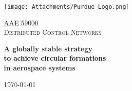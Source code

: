 %
%
%

\begin{titlepage}

\center %


\texttt{[image: Attachments/Purdue\_Logo.png]}\\
\vspace{1in}
 


\textsc{\LARGE AAE 59000}\\ 			%
\bigskip
\textsc{\LARGE Distributed Control Networks}\\	%
\vspace{1in}


{ \huge \bfseries A globally stable strategy }\\ 
\vspace{.1in}
{ \huge \bfseries to achieve circular formations}\\
\vspace{.1in}
{ \huge \bfseries in aerospace systems}\\ 
\vspace{.5in}


{\large \today}\\ %
\vspace{1in}


\end{titlepage}
